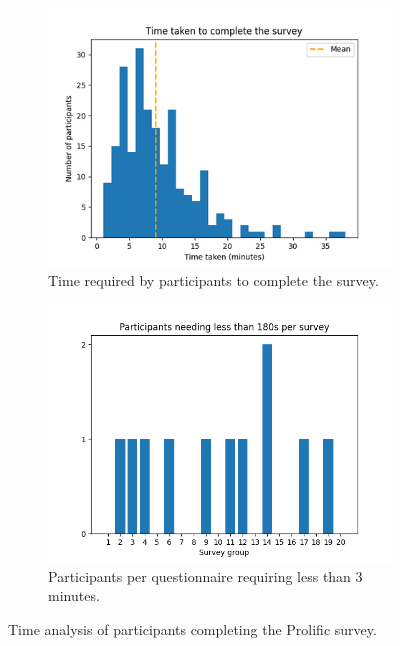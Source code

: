 \documentclass[%
class=scrreprt,
chapterprefix=false,%
open=right,%
twoside=false,%
paper=a4,%
logofile={Logo\_zentral\_farbig\_EN.png},%
thesistype=master,%
UKenglish,%
]{se2thesis}
\theoremstyle{definition}
\begin{document}
	\begin{figure}[tb]
		\centering
		\begin{subfigure}{0.49\textwidth}
			\includegraphics[width=\linewidth]{img/survey_time_histogramm.png}
			\caption{Time required by participants to complete the survey.}
			\label{fig:survey_time_histogramm}
		\end{subfigure}
		\hfill
		\begin{subfigure}{0.49\textwidth}
			\includegraphics[width=\linewidth]{img/survey_time_less_than_180.png}
			\caption{Participants per questionnaire requiring less than 3 minutes.}
			\label{fig:survey_time_less_than_180}
		\end{subfigure}
		\caption{Time analysis of participants completing the Prolific survey.}
		\label{fig:survey_time_prolific}
	\end{figure}
	
\end{document}
